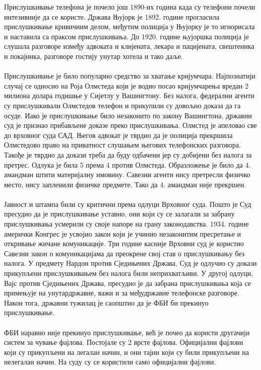 \documentclass{article}
\begin{document}
Прислушкивање телефона је почело још 1890-их година када су телефони почели интезивније да се користе. Држава Њујорк је 1892. године прогласила прислушкивање кривичним делом, међутим полиција у Њујорку је то игнорисала и наставила са праксом прислушкивања. До 1920. године њујоршка полиција је слушала разговоре између адвоката и клијената, лекара и пацијената, свештеника и покајника, разговоре гостију унутар хотела и тако даље.
\\\\
Прислушкивање је било популарно средство за хватање кријумчара. Најпознатији случај се односио на Роја Олмстеда који је водио посао кријумчарења вредан 2 милиона долара годишње у Сијетлу у Вашингтону. Без налога, федерални агенти су прислушкивали Олмстедов телефон и прикупили су довољно доказа да га осуде. Иако је прислушкивање било незаконито по закону Вашингтона, државни суд је признао прибављене доказе преко прислушкивања. Олмстед је апеловао све до врховног суда САД. Његов адвокат је тврдио да је полиција прекршила Олмстедово право на приватност слушањем његових телефонских разговора. Такође је тврдио да докази треба да буду одбачени јер су добијени без налога за претрес. Одлука је била 5 према 4 против Олмстеда. Образложење је било да 4. амандман штити материјалну имовину. Савезни агенти нису претресли физичко место, нису запленили физичке предмете. Тако да 4. амандман није прекршен.
\\\\
Јавност и штампа били су критични према одлуци Врховног суда. Пошто је Суд пресудио да је прислушкивање уставно, они који су се залагали за забрану прислушкивања усмерили су своје напоре на грану законодавства. 1934. године амерички Конгрес је усвојио закон који је учинио незаконитим пресретање и откривање жичане комуникације. Три године касније Врховни суд је користио Савезни закон о комуникацијама да преокрене свој став о прислушкивању без налога. У предмету Нардон против Сједињених Држава, Суд је одлучио су докази прикупљени прислушкивањем без налога били неприхватљиви. У другој одлуци, Вајс против Сједињених Држава, пресудио је да забрана прислушкивања која се примењује на унутардржавне, важи и за међудржавне телефонске разговоре. Након тога, државни тужилац је саопштио да је ФБИ би прекинуо прислушкивање.
\\\\
ФБИ наравно није прекинуо прислушкивање, већ је почео да користи другачији систем за чување фајлова. Постојале су 2 врсте фајлова. Официјални фајлови који су прикупљени на легалан начин, и они тајни који су били прикупљени на нелегалан начин. На суду су се користили само официјални фајлови.
\end{document}

